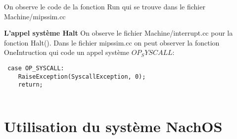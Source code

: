 \documentclass[a4paper,10pt]{article}
\begin{document}
On observe le code de la fonction Run qui se trouve dans le fichier 
Machine/mipssim.cc 

\textbf{L'appel système Halt} On observe le fichier Machine/interrupt.cc
pour la fonction Halt(). Dans le fichier mipssim.cc on peut observer
la fonction OneIntruction qui code un appel système $OP_SYSCALL$:

\begin{lstlisting}
 case OP_SYSCALL:
	RaiseException(SyscallException, 0);
	return; 
 
\end{lstlisting}


\section{Utilisation du système NachOS}
\end{document}
